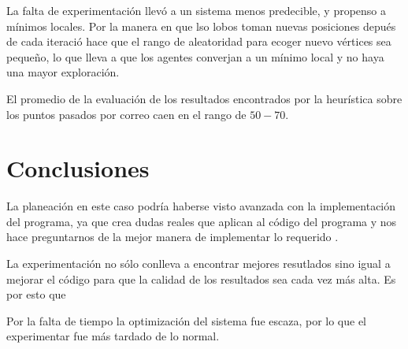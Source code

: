 \documentclass[a4paper]{article}
\begin{document}
La falta de experimentaci\'on llev\'o a un sistema menos predecible, y propenso a m\'inimos locales.
Por la manera en que lso lobos toman nuevas posiciones depu\'es de cada iteraci\'o hace que el rango de aleatoridad para ecoger nuevo v\'ertices sea pequeño, lo que lleva a que los agentes converjan a
un m\'inimo local y no haya una mayor exploraci\'on.

El promedio de la evaluaci\'on de los resultados encontrados por la heur\'istica sobre los puntos pasados por correo caen en el rango de $50 - 70$. 




\section*{Conclusiones}
La planeaci\'on en este caso podr\'ia haberse visto avanzada con la implementaci\'on del programa,
ya que crea dudas reales que aplican al c\'odigo del programa y nos hace preguntarnos de la mejor
manera de implementar lo requerido .

La experimentaci\'on no s\'olo conlleva a encontrar mejores resutlados sino igual a mejorar el
c\'odigo para que la calidad de los resultados sea cada vez m\'as alta. Es por esto que

Por la falta de tiempo la optimización del sistema fue escaza, por lo que el experimentar fue m\'as
tardado de lo normal.


{}

\end{document}
